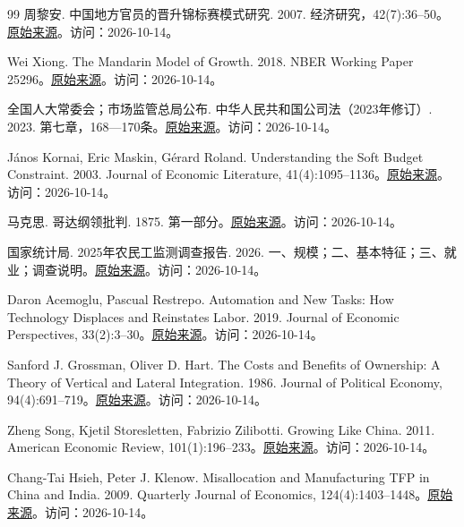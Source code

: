 \documentclass[UTF8,fontset=fandol,zihao=-4,oneside,openany]{ctexbook}
\begin{document}
\begin{thebibliography}{99}
 周黎安. 中国地方官员的晋升锦标赛模式研究. 2007. 经济研究，42(7):36–50。\href{\detokenize{https://ir.pku.edu.cn/handle/20.500.11897/73869}}{原始来源}。访问：2026-10-14。

 Wei Xiong. The Mandarin Model of Growth. 2018. NBER Working Paper 25296。\href{\detokenize{https://www.nber.org/papers/w25296}}{原始来源}。访问：2026-10-14。

 全国人大常委会；市场监管总局公布. 中华人民共和国公司法（2023年修订）. 2023. 第七章，168—170条。\href{\detokenize{https://www.samr.gov.cn/zw/zfxxgk/fdzdgknr/fgs/art/2023/art_067c072db6ef4679a2e0180996be4cf8.html}}{原始来源}。访问：2026-10-14。

 János Kornai, Eric Maskin, Gérard Roland. Understanding the Soft Budget Constraint. 2003. Journal of Economic Literature, 41(4):1095–1136。\href{\detokenize{https://pubs.aeaweb.org/doi/abs/10.1257/002205103771799999}}{原始来源}。访问：2026-10-14。

 马克思. 哥达纲领批判. 1875. 第一部分。\href{\detokenize{https://www.marxists.org/archive/marx/works/1875/gotha/ch01.htm}}{原始来源}。访问：2026-10-14。

 国家统计局. 2025年农民工监测调查报告. 2026. 一、规模；二、基本特征；三、就业；调查说明。\href{\detokenize{https://www.stats.gov.cn/sj/zxfb/202604/t20260430_1963472.html}}{原始来源}。访问：2026-10-14。

 Daron Acemoglu, Pascual Restrepo. Automation and New Tasks: How Technology Displaces and Reinstates Labor. 2019. Journal of Economic Perspectives, 33(2):3–30。\href{\detokenize{https://pubs.aeaweb.org/doi/abs/10.1257/jep.33.2.3}}{原始来源}。访问：2026-10-14。

 Sanford J. Grossman, Oliver D. Hart. The Costs and Benefits of Ownership: A Theory of Vertical and Lateral Integration. 1986. Journal of Political Economy, 94(4):691–719。\href{\detokenize{https://www.journals.uchicago.edu/doi/10.1086/261404}}{原始来源}。访问：2026-10-14。

 Zheng Song, Kjetil Storesletten, Fabrizio Zilibotti. Growing Like China. 2011. American Economic Review, 101(1):196–233。\href{\detokenize{https://www.aeaweb.org/articles?id=10.1257/aer.101.1.196}}{原始来源}。访问：2026-10-14。

 Chang-Tai Hsieh, Peter J. Klenow. Misallocation and Manufacturing TFP in China and India. 2009. Quarterly Journal of Economics, 124(4):1403–1448。\href{\detokenize{https://academic.oup.com/qje/article-abstract/124/4/1403/1917179}}{原始来源}。访问：2026-10-14。


\end{thebibliography}
\end{document}
